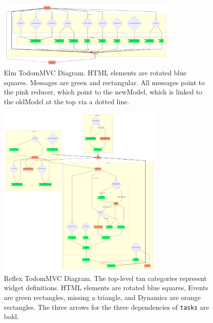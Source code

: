 \documentclass[sigconf]{acmart}
\begin{document}
\begin{figure}[pt]
\includegraphics[width=0.8\textwidth]{elm-graph}
\centering
\caption{Elm TodomMVC Diagram. HTML elements are rotated blue squares. Messages are green and rectangular. All messages point to the pink reducer, which point to the newModel, which is linked to the oldModel at the top via a dotted line.}
\label{fig:figure 6}
\end{figure}

\begin{figure}[pb]
\includegraphics[width=0.73\textwidth]{reflex-graph}
\caption{Reflex TodomMVC Diagram. The top-level tan categories represent widget definitions. HTML elements are rotated blue squares, Events are green rectangles, missing a triangle, and Dynamics are orange rectangles. The three arrows for the three dependencies of \lstinline{tasks} are bold.}
\label{fig:figure 7}
\end{figure}
\end{document}
